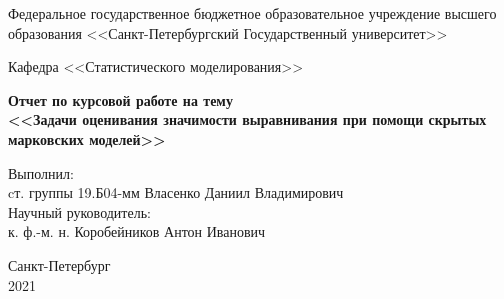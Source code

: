 \documentclass[]{article}
\begin{document}
	\begin{titlepage}
		\begin{center}
			{\large Федеральное государственное бюджетное образовательное учреждение высшего образования
			<<Санкт-Петербургский Государственный университет>>}
			\vspace{1em}
			
			{\large Кафедра <<Статистического моделирования>>}
			\vspace{18em}
			
			{\bfseries{\Large Отчет по курсовой работе на тему\\ <<Задачи оценивания значимости выравнивания при помощи скрытых марковских моделей>>}}
		\end{center}
		\vspace{10em}
		\begin{flushleft}
			Выполнил:\\
			cт. группы 19.Б04-мм Власенко Даниил Владимирович\\
			Научный руководитель:\\
			к. ф.-м. н. Коробейников Антон Иванович
		\end{flushleft}
		\vspace{20em}
		\begin{center}
			Санкт-Петербург\\
			2021
		\end{center}
	\end{titlepage}

	
\end{document}

